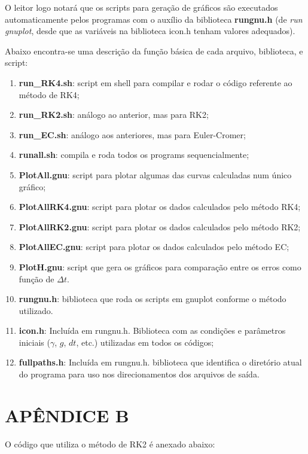 \documentclass[a4paper, brazilian, 8pt, final]{article}
\begin{document}
\begin{multicols}{2}
O leitor logo notará que os scripts para geração de gráficos são executados automaticamente pelos programas com o auxílio da biblioteca \textbf{rungnu.h} (de \textit{run gnuplot}, desde que as variáveis na biblioteca icon.h tenham valores adequados).

Abaixo encontra-se uma descrição da função básica de cada arquivo, biblioteca, e script:

\begin{enumerate}
\item {\textbf{run\_RK4.sh}: script em shell para compilar e rodar o código referente ao método de RK4;}
\item{\textbf{run\_RK2.sh}: análogo ao anterior, mas para RK2;}
\item{\textbf{run\_EC.sh}: análogo aos anteriores, mas para Euler-Cromer;}
\item{\textbf{runall.sh}: compila e roda todos os programs sequencialmente;}
\item{\textbf{PlotAll.gnu}: script para plotar algumas das curvas calculadas num único gráfico;}
\item{\textbf{PlotAllRK4.gnu}: script para plotar os dados calculados pelo método RK4;}
\item{\textbf{PlotAllRK2.gnu}: script para plotar os dados calculados pelo método RK2;}
\item{\textbf{PlotAllEC.gnu}: script para plotar os dados calculados pelo método EC;}
\item{\textbf{PlotH.gnu}: script que gera os gráficos para comparação entre os erros como função de $\Delta t$.}
\item{\textbf{rungnu.h}: biblioteca que roda os scripts em gnuplot conforme o método utilizado.}
\item{\textbf{icon.h}: Incluída em rungnu.h. Biblioteca com as condições e parâmetros iniciais ($\gamma$, $g$, $dt$, etc.) utilizadas em todos os códigos;}
\item{\textbf{fullpaths.h}: Incluída em rungnu.h. biblioteca que identifica o diretório atual do programa para uso nos direcionamentos dos arquivos de saída.}
\end{enumerate}
\end{multicols}

\section*{APÊNDICE B}
\quad O código que utiliza o método de RK2 é anexado abaixo:
\end{document}
